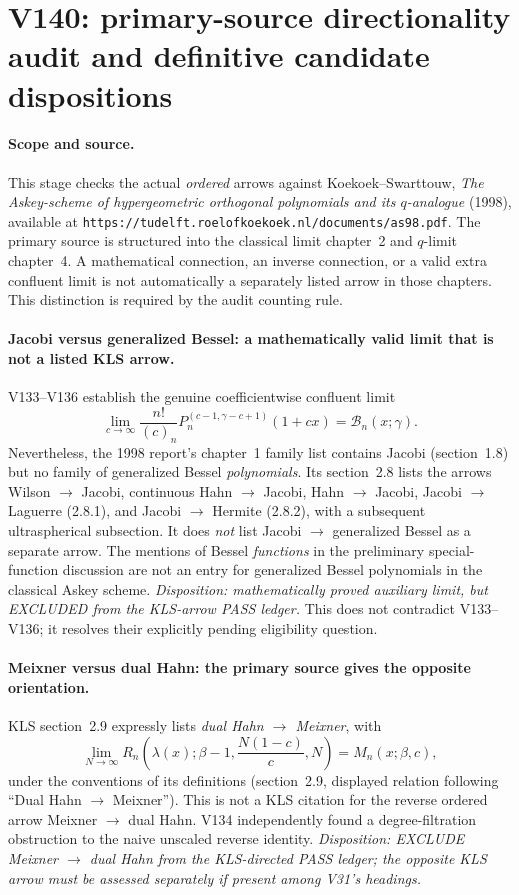 \documentclass[11pt]{article}
\begin{document}
\section{V140: primary-source directionality audit and definitive candidate dispositions}
\label{sec:v140}
\paragraph{Scope and source.}
This stage checks the actual \emph{ordered} arrows against Koekoek--Swarttouw,
\emph{The Askey-scheme of hypergeometric orthogonal polynomials and its
$q$-analogue} (1998), available at
\texttt{https://tudelft.roelofkoekoek.nl/documents/as98.pdf}.
The primary source is structured into the classical limit chapter~2 and
$q$-limit chapter~4.  A mathematical connection, an inverse connection, or a
valid extra confluent limit is not automatically a separately listed arrow
in those chapters.  This distinction is required by the audit counting rule.

\paragraph{Jacobi versus generalized Bessel: a mathematically valid limit
that is not a listed KLS arrow.}
V133--V136 establish the genuine coefficientwise confluent limit
\[
 \lim_{c\to\infty}\frac{n!}{(c)_n}
 P_n^{(c-1,\gamma-c+1)}(1+cx)
 =\mathcal B_n(x;\gamma).
\]
Nevertheless, the 1998 report's chapter~1 family list contains Jacobi
(section~1.8) but no family of generalized Bessel \emph{polynomials}.
Its section~2.8 lists the arrows Wilson $\to$ Jacobi, continuous Hahn
$\to$ Jacobi, Hahn $\to$ Jacobi, Jacobi $\to$ Laguerre (2.8.1), and
Jacobi $\to$ Hermite (2.8.2), with a subsequent ultraspherical subsection.
It does \emph{not} list Jacobi $\to$ generalized Bessel as a separate
arrow.  The mentions of Bessel \emph{functions} in the preliminary
special-function discussion are not an entry for generalized Bessel
polynomials in the classical Askey scheme.
\emph{Disposition: mathematically proved auxiliary limit, but EXCLUDED
from the KLS-arrow PASS ledger.}  This does not contradict V133--V136;
it resolves their explicitly pending eligibility question.

\paragraph{Meixner versus dual Hahn: the primary source gives the
opposite orientation.}
KLS section~2.9 expressly lists \emph{dual Hahn $\to$ Meixner}, with
\[
 \lim_{N\to\infty}
 R_n\!\left(\lambda(x);\beta-1,
             \frac{N(1-c)}{c},N\right)
 =M_n(x;\beta,c),
\]
under the conventions of its definitions (section~2.9, displayed relation
following ``Dual Hahn $\to$ Meixner'').
This is not a KLS citation for the reverse ordered arrow
Meixner $\to$ dual Hahn.  V134 independently found a degree-filtration
obstruction to the naive unscaled reverse identity.
\emph{Disposition: EXCLUDE Meixner $\to$ dual Hahn from the
KLS-directed PASS ledger; the opposite KLS arrow must be assessed
separately if present among V31's headings.}
\end{document}
